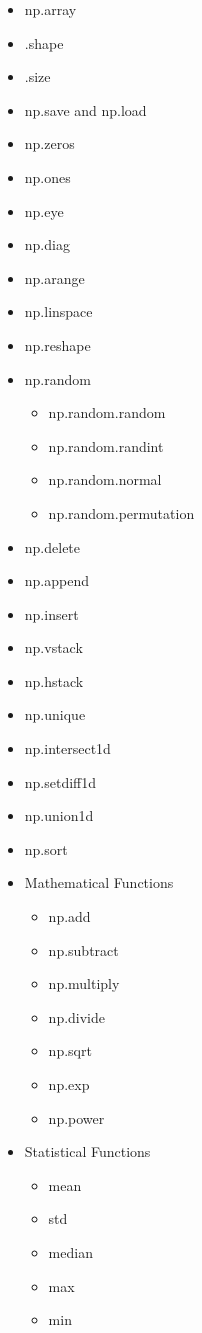 \documentclass{article}
\begin{document}
	\begin{itemize}
		\item np.array
		\item .shape
		\item .size
		\item np.save and np.load
		\item np.zeros
		\item np.ones
		\item np.eye
		\item np.diag
		\item np.arange
		\item np.linspace
		\item np.reshape
		\item np.random
			\begin{itemize}
				\item np.random.random
				\item np.random.randint
				\item np.random.normal
				\item np.random.permutation
			\end{itemize}
		\item np.delete
		\item np.append
		\item np.insert
		\item np.vstack
		\item np.hstack
		\item np.unique
		\item np.intersect1d
		\item np.setdiff1d
		\item np.union1d
		\item np.sort
		\item Mathematical Functions
		\begin{itemize}
			\item np.add
			\item np.subtract
			\item np.multiply
			\item np.divide
			\item np.sqrt
			\item np.exp
			\item np.power 
		\end{itemize}
		\item Statistical Functions
		\begin{itemize}
			\item mean
			\item std
			\item median
			\item max
			\item min
		\end{itemize}
	\end{itemize}
\end{document}
